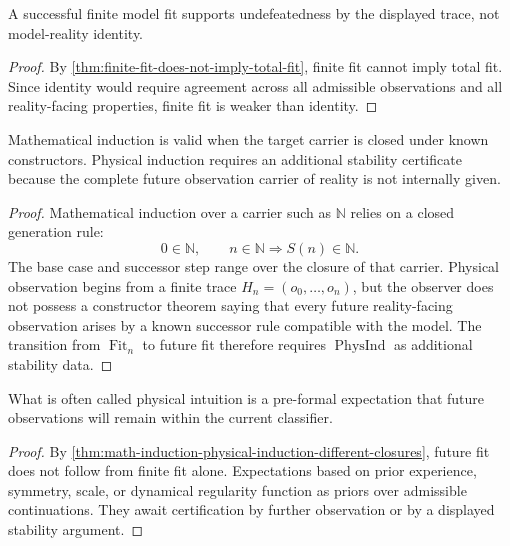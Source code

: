 \begin{corollary}
\label{cor:empirical-truth-not-model-identity}
A successful finite model fit supports undefeatedness by the displayed trace, not model-reality identity.
\end{corollary}

\begin{proof}
By \autoref{thm:finite-fit-does-not-imply-total-fit}, finite fit cannot imply total fit. Since identity would require agreement across all admissible observations and all reality-facing properties, finite fit is weaker than identity.
\end{proof}

\begin{theorem}
\label{thm:math-induction-physical-induction-different-closures}
Mathematical induction is valid when the target carrier is closed under known constructors. Physical induction requires an additional stability certificate because the complete future observation carrier of reality is not internally given.
\end{theorem}

\begin{proof}
Mathematical induction over a carrier such as $\mathbb{N}$ relies on a closed generation rule:
$$
0\in\mathbb{N},
\qquad
n\in\mathbb{N}\Longrightarrow S(n)\in\mathbb{N}.
$$
The base case and successor step range over the closure of that carrier. Physical observation begins from a finite trace $H_n=(o_0,\ldots,o_n)$, but the observer does not possess a constructor theorem saying that every future reality-facing observation arises by a known successor rule compatible with the model. The transition from $\operatorname{Fit}_n$ to future fit therefore requires $\operatorname{PhysInd}$ as additional stability data.
\end{proof}

\begin{corollary}
\label{cor:physical-intuition-classifier-prior}
What is often called physical intuition is a pre-formal expectation that future observations will remain within the current classifier.
\end{corollary}

\begin{proof}
By \autoref{thm:math-induction-physical-induction-different-closures}, future fit does not follow from finite fit alone. Expectations based on prior experience, symmetry, scale, or dynamical regularity function as priors over admissible continuations. They await certification by further observation or by a displayed stability argument.
\end{proof}

